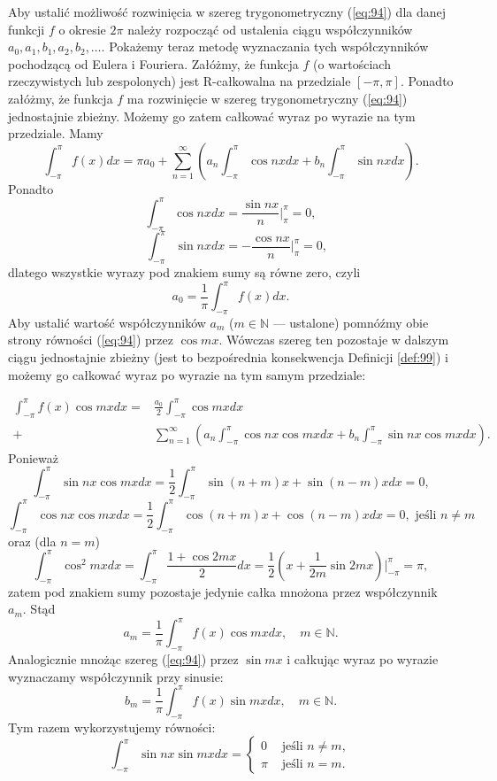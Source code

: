 \documentclass[leqno]{article}
\begin{document}
\begin{justify}
Aby ustalić możliwość rozwinięcia w szereg trygonometryczny (\ref{eq:94}) dla danej funkcji $f$ o okresie $2\pi$ należy rozpocząć od ustalenia
ciągu współczynników $a_0, a_1, b_1, a_2, b_2, \ldots$. Pokażemy teraz metodę wyznaczania tych współczynników pochodzącą od Eulera i Fouriera.
Załóżmy, że funkcja $f$ (o wartościach rzeczywistych lub zespolonych) jest R-całkowalna na przedziale $[-\pi, \pi]$. Ponadto załóżmy, że funkcja $f$
ma rozwinięcie w szereg trygonometryczny (\ref{eq:94}) jednostajnie zbieżny. Możemy go zatem całkować wyraz po wyrazie na tym przedziale. Mamy
\[
    \int_{-\pi}^{\pi}f(x)dx = \pi a_0 + \sum_{n=1}^{\infty}(a_n \int_{-\pi}^{\pi} \cos nx dx + b_n \int_{-\pi}^{\pi} \sin nx dx).
\]
Ponadto
\[
    \int_{-\pi}^{\pi} \cos nx dx = \frac{\sin nx}{n}\Big|_{\pi}^{\pi} = 0,
\]
\[
    \quad \int_{-\pi}^{\pi} \sin nx dx = -\frac{\cos nx}{n}\Big|_{\pi}^{\pi} = 0,
\]
dlatego wszystkie wyrazy pod znakiem sumy są równe zero, czyli
\[
    a_0 = \frac{1}{\pi}\int_{-\pi}^{\pi}f(x)dx.
\]
Aby ustalić wartość współczynników $a_m$ ($m \in \mathbb{N}$ --- ustalone) pomnóźmy obie strony równości (\ref{eq:94}) przez $\cos mx$. 
Wówczas szereg ten pozostaje w dalszym ciągu jednostajnie zbieżny (jest to bezpośrednia konsekwencja Definicji \ref{def:99}) i możemy go całkować wyraz
po wyrazie na tym samym przedziale:

\begin{align*}
    \int_{-\pi}^{\pi}f(x)\cos mx dx =& \frac{a_0}{2}\int_{-\pi}^{\pi}\cos mx dx \\
    +& \sum_{n=1}^{\infty}(a_n \int_{-\pi}^{\pi}\cos nx \cos mx dx + b_n \int_{-\pi}^{\pi} \sin nx \cos mx dx).
\end{align*}
Ponieważ 
\[
    \int_{-\pi}^{\pi} \sin nx \cos mx dx = \frac{1}{2} \int_{-\pi}^{\pi} \sin(n + m)x + \sin(n - m)x dx = 0,
\]
\[
    \int_{-\pi}^{\pi} \cos nx \cos mx dx = \frac{1}{2}\int_{-\pi}^{\pi}\cos(n + m)x + \cos(n - m)x dx = 0, \text{ jeśli } n \neq m
\]
oraz (dla $n = m$)
\[
    \int_{-\pi}^{\pi} \cos^2 mx dx = \int_{-\pi}^{\pi} \frac{1 + \cos 2mx}{2}dx = \frac{1}{2}(x + \frac{1}{2m}\sin 2mx) \Big|_{-\pi}^{\pi} = \pi,
\]
zatem pod znakiem sumy pozostaje jedynie całka mnożona przez współczynnik $a_m$. Stąd 
\[
    a_m = \frac{1}{\pi}\int_{-\pi}^{\pi} f(x) \cos mx dx, \quad m \in \mathbb{N}.
\]
Analogicznie mnożąc szereg (\ref{eq:94}) przez $\sin mx$ i całkując wyraz po wyrazie wyznaczamy współczynnik przy sinusie:
\[
    b_m = \frac{1}{\pi}\int_{-\pi}^{\pi}f(x)\sin mx dx, \quad m \in \mathbb{N}.
\]
Tym razem wykorzystujemy równości:
\[
    \int_{-\pi}^{\pi} \sin nx \sin mx dx = 
    \begin{cases}
        0 & \text{ jeśli } n \neq m, \\
        \pi & \text{ jeśli } n = m. 
    \end{cases}
\]


\end{justify}
\end{document}
